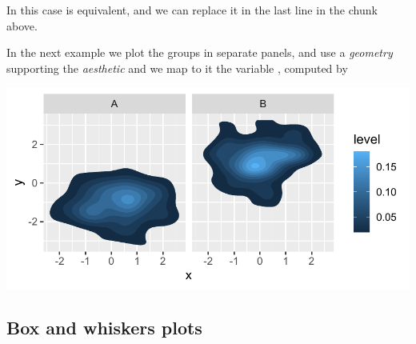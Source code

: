 \documentclass[krantz2]{krantz}\usepackage{knitr}
\begin{document}
In this case  is equivalent, and we can replace it in the last line in the chunk above.

\begin{knitrout}\footnotesize
{}\color{fgcolor}\begin{kframe}
\begin{alltt}
  \hlstd{()}
\end{alltt}
\end{kframe}
\end{knitrout}

In the next example we plot the groups in separate panels, and use a \emph{geometry} supporting the  \emph{aesthetic} and we map to it the variable , computed by 



\begin{knitrout}\footnotesize
{}\color{fgcolor}\begin{kframe}
\begin{alltt}
  \hlopt{+}
\hlstd{(}\hlstd{(} \hlstd{=}   \hlstd{=} \hlstd{)} \hlopt{+}
  \hlstd{(}\hlopt{~}
\end{alltt}
\end{kframe}

{\centering \includegraphics[width=.7\textwidth]{figure/pos-density-plot-12-1} 

}



\end{knitrout}



\subsection{Box and whiskers plots}\label{sec:boxplot}
\end{document}
